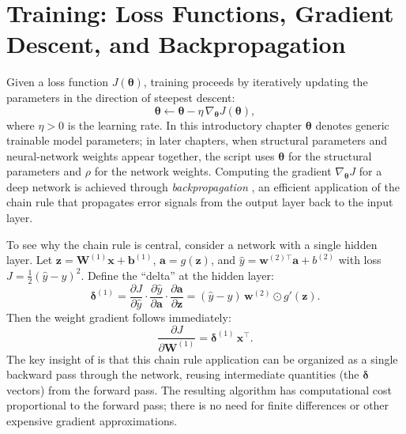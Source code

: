 \documentclass[11pt,a4paper]{report}
\newcommand{\x}{\bm{x}}
\newcommand{\w}{\bm{w}}
\newcommand{\bb}{\bm{b}}
\newcommand{\z}{\bm{z}}
\newcommand{\W}{\bm{W}}
\renewcommand{\a}{\bm{a}}
\begin{document}
\section{Training: Loss Functions, Gradient Descent, and Backpropagation}
\label{sec:training}

Given a loss function $J(\bm{\theta})$, training proceeds by iteratively updating the parameters in the direction of steepest descent:
\begin{equation}
\bm{\theta} \leftarrow \bm{\theta} - \eta\,\nabla_{\!\bm{\theta}} J(\bm{\theta}),
\label{eq:gd}
\end{equation}
where $\eta > 0$ is the learning rate.  In this introductory chapter $\bm{\theta}$ denotes generic trainable model parameters; in later chapters, when structural parameters and neural-network weights appear together, the script uses $\bm{\theta}$ for the structural parameters and $\rho$ for the network weights.  Computing the gradient $\nabla_{\!\bm{\theta}} J$ for a deep network is achieved through \emph{backpropagation} \citep{rumelhart1986learning}, an efficient application of the chain rule that propagates error signals from the output layer back to the input layer.

To see why the chain rule is central, consider a network with a single hidden layer.  Let $\z = \W^{(1)}\x + \bb^{(1)}$, $\a = g(\z)$, and $\hat{y} = \w^{(2)\top}\a + b^{(2)}$ with loss $J = \tfrac{1}{2}(\hat{y}-y)^2$.  Define the ``delta'' at the hidden layer:
\begin{equation}
\bm{\delta}^{(1)} = \frac{\partial J}{\partial \hat{y}} \cdot \frac{\partial \hat{y}}{\partial \a} \cdot \frac{\partial \a}{\partial \z} = (\hat{y}-y)\,\w^{(2)} \odot g'(\z).
\end{equation}
Then the weight gradient follows immediately:
\begin{equation}
\frac{\partial J}{\partial \W^{(1)}} = \bm{\delta}^{(1)}\,\x^\top.
\end{equation}
The key insight of \citet{rumelhart1986learning} is that this chain rule application can be organized as a single backward pass through the network, reusing intermediate quantities (the $\bm{\delta}$ vectors) from the forward pass.  The resulting algorithm has computational cost proportional to the forward pass; there is no need for finite differences or other expensive gradient approximations.
\end{document}
